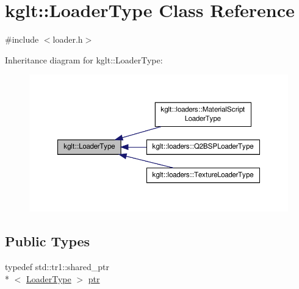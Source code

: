 \hypertarget{classkglt_1_1_loader_type}{\section{kglt\-:\-:Loader\-Type Class Reference}
\label{classkglt_1_1_loader_type}
}


{\ttfamily \#include $<$loader.\-h$>$}



Inheritance diagram for kglt\-:\-:Loader\-Type\-:\nopagebreak
\begin{figure}[H]
\begin{center}
\leavevmode
\includegraphics[width=350pt]{classkglt_1_1_loader_type__inherit__graph}
\end{center}
\end{figure}
\subsection*{Public Types}
\begin{DoxyCompactItemize}
\item 
typedef std\-::tr1\-::shared\-\_\-ptr\\*
$<$ \hyperlink{classkglt_1_1_loader_type}{Loader\-Type} $>$ \hyperlink{classkglt_1_1_loader_type_aac97975ad71c116297a557c5ca1e993b}{ptr}
\end{DoxyCompactItemize}
